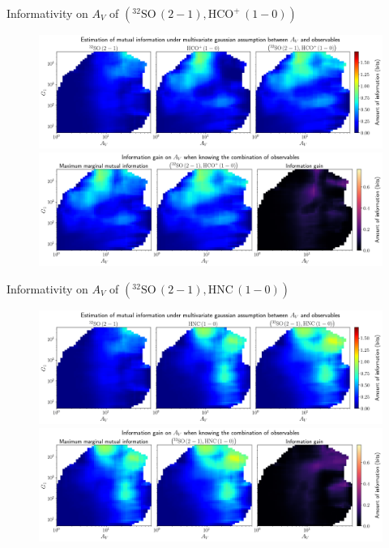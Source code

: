 \documentclass{beamer}
\begin{document}
\begin{frame}{Informativity on $A_V$ of $\left(\mathrm{^{32}SO\,(2-1)},\mathrm{HCO^+\,(1-0)}\right)$}
    \begin{figure}
        \centering
        \includegraphics[width=0.95\linewidth]{../linearinfo/av__32so21_hcop10_linearinfo.png}
        \vfill
        \includegraphics[width=0.95\linewidth]{../linearinfo/av__32so21_hcop10_linearinfo_gain.png}
    \end{figure}
\end{frame}

\begin{frame}{Informativity on $A_V$ of $\left(\mathrm{^{32}SO\,(2-1)},\mathrm{HNC\,(1-0)}\right)$}
    \begin{figure}
        \centering
        \includegraphics[width=0.95\linewidth]{../linearinfo/av__32so21_hnc10_linearinfo.png}
        \vfill
        \includegraphics[width=0.95\linewidth]{../linearinfo/av__32so21_hnc10_linearinfo_gain.png}
    \end{figure}
\end{frame}
\end{document}
